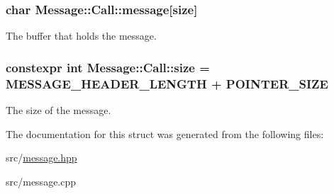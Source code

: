 \subsubsection[{\texorpdfstring{message}{message}}]{\setlength{\rightskip}{0pt plus 5cm}char Message\+::\+Call\+::message\mbox{[}{\bf size}\mbox{]}}\hypertarget{struct_message_1_1_call_ab2d9545785f8d916a0a19d798bce5517}{}\label{struct_message_1_1_call_ab2d9545785f8d916a0a19d798bce5517}


The buffer that holds the message. 

\subsubsection[{\texorpdfstring{size}{size}}]{\setlength{\rightskip}{0pt plus 5cm}constexpr int Message\+::\+Call\+::size = {\bf M\+E\+S\+S\+A\+G\+E\+\_\+\+H\+E\+A\+D\+E\+R\+\_\+\+L\+E\+N\+G\+TH} + {\bf P\+O\+I\+N\+T\+E\+R\+\_\+\+S\+I\+ZE}\hspace{0.3cm}{\ttfamily [static]}}\hypertarget{struct_message_1_1_call_af3bcd2cba96de67284b697d2bc5106e9}{}\label{struct_message_1_1_call_af3bcd2cba96de67284b697d2bc5106e9}


The size of the message. 



The documentation for this struct was generated from the following files\+:\begin{DoxyCompactItemize}
\item 
src/\hyperlink{message_8hpp}{message.\+hpp}\item 
src/message.\+cpp\end{DoxyCompactItemize}

